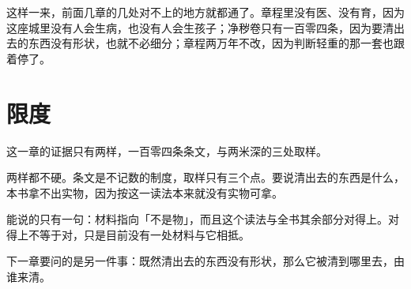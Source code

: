 这样一来，前面几章的几处对不上的地方就都通了。章程里没有医、没有育，因为这座城里没有人会生病，也没有人会生孩子；净秽卷只有一百零四条，因为要清出去的东西没有形状，也就不必细分；章程两万年不改，因为判断轻重的那一套也跟着停了。

\section{限度}

这一章的证据只有两样，一百零四条条文，与两米深的三处取样。

两样都不硬。条文是不记数的制度，取样只有三个点。要说清出去的东西是什么，本书拿不出实物，因为按这一读法本来就没有实物可拿。

能说的只有一句：材料指向「不是物」，而且这个读法与全书其余部分对得上。对得上不等于对，只是目前没有一处材料与它相抵。

下一章要问的是另一件事：既然清出去的东西没有形状，那么它被清到哪里去，由谁来清。
